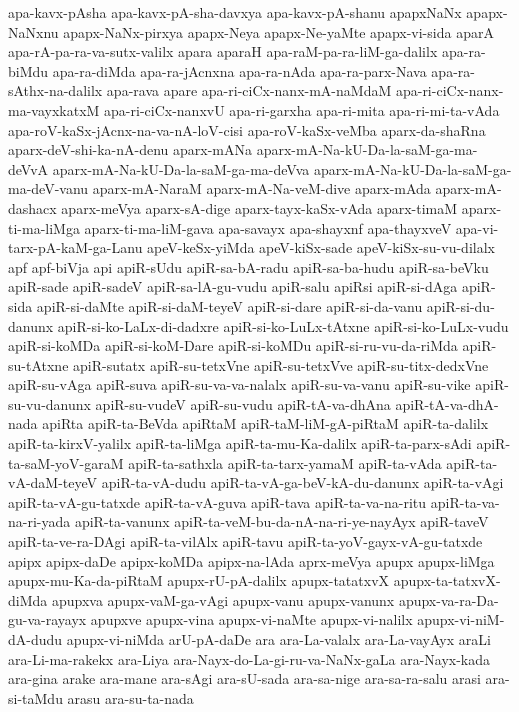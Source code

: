 {apa-kavx-pAsha
apa-kavx-pA-sha-davxya
apa-kavx-pA-shanu
apapxNaNx
apapx-NaNxnu
apapx-NaNx-pirxya
apapx-Neya
apapx-Ne-yaMte
apapx-vi-sida
aparA
apa-rA-pa-ra-va-sutx-valilx
apara
aparaH
apa-raM-pa-ra-liM-ga-dalilx
apa-ra-biMdu
apa-ra-diMda
apa-ra-jAcnxna
apa-ra-nAda
apa-ra-parx-Nava
apa-ra-sAthx-na-dalilx
apa-rava
apare
apa-ri-ciCx-nanx-mA-naMdaM
apa-ri-ciCx-nanx-ma-vayxkatxM
apa-ri-ciCx-nanxvU
apa-ri-garxha
apa-ri-mita
apa-ri-mi-ta-vAda
apa-roV-kaSx-jAcnx-na-va-nA-loV-cisi
apa-roV-kaSx-veMba
aparx-da-shaRna
aparx-deV-shi-ka-nA-denu
aparx-mANa
aparx-mA-Na-kU-Da-la-saM-ga-ma-deVvA
aparx-mA-Na-kU-Da-la-saM-ga-ma-deVva
aparx-mA-Na-kU-Da-la-saM-ga-ma-deV-vanu
aparx-mA-NaraM
aparx-mA-Na-veM-dive
aparx-mAda
aparx-mA-dashacx
aparx-meVya
aparx-sA-dige
aparx-tayx-kaSx-vAda
aparx-timaM
aparx-ti-ma-liMga
aparx-ti-ma-liM-gava
apa-savayx
apa-shayxnf
apa-thayxveV
apa-vi-tarx-pA-kaM-ga-Lanu
apeV-keSx-yiMda
apeV-kiSx-sade
apeV-kiSx-su-vu-dilalx
apf
apf-biVja
api
apiR-sUdu
apiR-sa-bA-radu
apiR-sa-ba-hudu
apiR-sa-beVku
apiR-sade
apiR-sadeV
apiR-sa-lA-gu-vudu
apiR-salu
apiRsi
apiR-si-dAga
apiR-sida
apiR-si-daMte
apiR-si-daM-teyeV
apiR-si-dare
apiR-si-da-vanu
apiR-si-du-danunx
apiR-si-ko-LaLx-di-dadxre
apiR-si-ko-LuLx-tAtxne
apiR-si-ko-LuLx-vudu
apiR-si-koMDa
apiR-si-koM-Dare
apiR-si-koMDu
apiR-si-ru-vu-da-riMda
apiR-su-tAtxne
apiR-sutatx
apiR-su-tetxVne
apiR-su-tetxVve
apiR-su-titx-dedxVne
apiR-su-vAga
apiR-suva
apiR-su-va-va-nalalx
apiR-su-va-vanu
apiR-su-vike
apiR-su-vu-danunx
apiR-su-vudeV
apiR-su-vudu
apiR-tA-va-dhAna
apiR-tA-va-dhA-nada
apiRta
apiR-ta-BeVda
apiRtaM
apiR-taM-liM-gA-piRtaM
apiR-ta-dalilx
apiR-ta-kirxV-yalilx
apiR-ta-liMga
apiR-ta-mu-Ka-dalilx
apiR-ta-parx-sAdi
apiR-ta-saM-yoV-garaM
apiR-ta-sathxla
apiR-ta-tarx-yamaM
apiR-ta-vAda
apiR-ta-vA-daM-teyeV
apiR-ta-vA-dudu
apiR-ta-vA-ga-beV-kA-du-danunx
apiR-ta-vAgi
apiR-ta-vA-gu-tatxde
apiR-ta-vA-guva
apiR-tava
apiR-ta-va-na-ritu
apiR-ta-va-na-ri-yada
apiR-ta-vanunx
apiR-ta-veM-bu-da-nA-na-ri-ye-nayAyx
apiR-taveV
apiR-ta-ve-ra-DAgi
apiR-ta-vilAlx
apiR-tavu
apiR-ta-yoV-gayx-vA-gu-tatxde
apipx
apipx-daDe
apipx-koMDa
apipx-na-lAda
aprx-meVya
apupx
apupx-liMga
apupx-mu-Ka-da-piRtaM
apupx-rU-pA-dalilx
apupx-tatatxvX
apupx-ta-tatxvX-diMda
apupxva
apupx-vaM-ga-vAgi
apupx-vanu
apupx-vanunx
apupx-va-ra-Da-gu-va-rayayx
apupxve
apupx-vina
apupx-vi-naMte
apupx-vi-nalilx
apupx-vi-niM-dA-dudu
apupx-vi-niMda
arU-pA-daDe
ara
ara-La-valalx
ara-La-vayAyx
araLi
ara-Li-ma-rakekx
ara-Liya
ara-Nayx-do-La-gi-ru-va-NaNx-gaLa
ara-Nayx-kada
ara-gina
arake
ara-mane
ara-sAgi
ara-sU-sada
ara-sa-nige
ara-sa-ra-salu
arasi
ara-si-taMdu
arasu
ara-su-ta-nada
}
